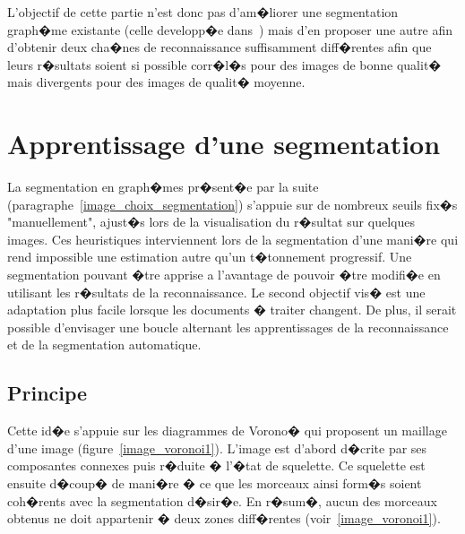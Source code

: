L'objectif de cette partie n'est donc pas d'am�liorer une segmentation graph�me existante (celle developp�e dans~) mais d'en proposer une autre afin d'obtenir deux cha�nes de reconnaissance suffisamment diff�rentes afin que leurs r�sultats soient si possible corr�l�s pour des images de bonne qualit� mais divergents pour des images de qualit� moyenne.







\section{Apprentissage d'une segmentation}
\label{image_apprentissage_segmentation}

La segmentation en graph�mes pr�sent�e par la suite (paragraphe~\ref{image_choix_segmentation}) s'appuie sur de nombreux seuils fix�s "manuellement", ajust�s lors de la visualisation du r�sultat sur quelques images. Ces heuristiques interviennent lors de la segmentation d'une mani�re qui rend impossible une estimation autre qu'un t�tonnement progressif. Une segmentation pouvant �tre apprise a l'avantage de pouvoir �tre modifi�e en utilisant les r�sultats de la reconnaissance. Le second objectif vis� est une adaptation plus facile lorsque les documents � traiter changent. De plus, il serait possible d'envisager une boucle alternant les apprentissages de la reconnaissance et de la segmentation automatique. 




\subsection{Principe}


Cette id�e s'appuie sur les diagrammes de Vorono� qui proposent un maillage d'une image (figure~\ref{image_voronoi1}). L'image est d'abord d�crite par ses composantes connexes puis r�duite � l'�tat de squelette. Ce squelette est ensuite d�coup� de mani�re � ce que les morceaux ainsi form�s soient coh�rents avec la segmentation d�sir�e. En r�sum�, aucun des morceaux obtenus ne doit appartenir � deux zones diff�rentes (voir~\ref{image_voronoi1}).

